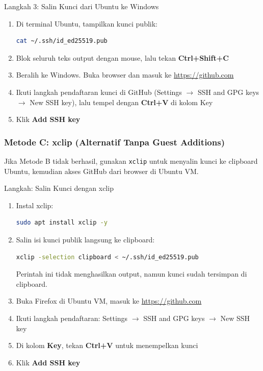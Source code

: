\documentclass[
    a4paper,
    11pt,
    parskip=half
]{scrartcl}
\begin{document}
\begin{stepbox}{Langkah 3: Salin Kunci dari Ubuntu ke Windows}
\begin{enumerate}
    \item Di terminal Ubuntu, tampilkan kunci publik:
\begin{lstlisting}[language=bash]
cat ~/.ssh/id_ed25519.pub
\end{lstlisting}

    \item Blok seluruh teks output dengan mouse, lalu tekan \textbf{Ctrl+Shift+C}

    \item Beralih ke Windows. Buka browser dan masuk ke \url{https://github.com}

    \item Ikuti langkah pendaftaran kunci di GitHub (Settings $\to$ SSH and GPG keys $\to$ New SSH key), lalu tempel dengan \textbf{Ctrl+V} di kolom Key

    \item Klik \textbf{Add SSH key}
\end{enumerate}
\end{stepbox}

\subsubsection*{Metode C: xclip (Alternatif Tanpa Guest Additions)}

Jika Metode B tidak berhasil, gunakan \texttt{xclip} untuk menyalin kunci ke clipboard Ubuntu, kemudian akses GitHub dari browser di Ubuntu VM.

\begin{stepbox}{Langkah: Salin Kunci dengan xclip}
\begin{enumerate}
    \item Instal xclip:
\begin{lstlisting}[language=bash]
sudo apt install xclip -y
\end{lstlisting}

    \item Salin isi kunci publik langsung ke clipboard:
\begin{lstlisting}[language=bash]
xclip -selection clipboard < ~/.ssh/id_ed25519.pub
\end{lstlisting}
    Perintah ini tidak menghasilkan output, namun kunci sudah tersimpan di clipboard.

    \item Buka Firefox di Ubuntu VM, masuk ke \url{https://github.com}

    \item Ikuti langkah pendaftaran: Settings $\to$ SSH and GPG keys $\to$ New SSH key

    \item Di kolom \textbf{Key}, tekan \textbf{Ctrl+V} untuk menempelkan kunci

    \item Klik \textbf{Add SSH key}
\end{enumerate}
\end{stepbox}
\end{document}
